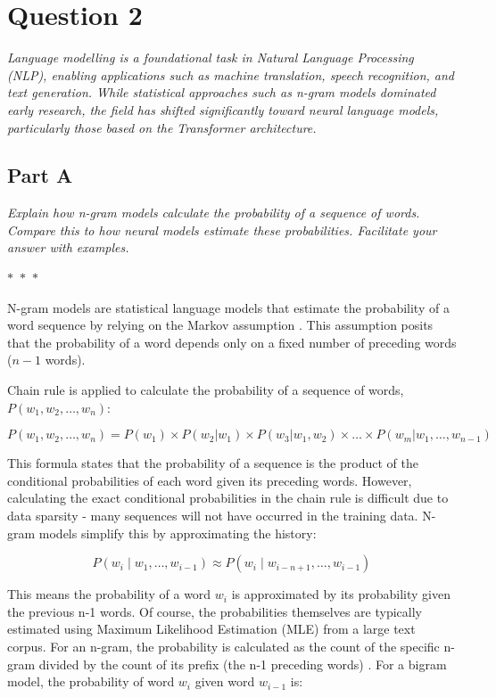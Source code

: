 \section*{Question 2}

\textit{Language modelling is a foundational task in Natural Language Processing (NLP), enabling applications such as machine translation, speech recognition, and text generation. While statistical approaches such as n-gram models dominated early research, the field has shifted significantly toward neural language models, particularly those based on the Transformer architecture.}

\subsection*{Part A}

\textit{Explain how n-gram models calculate the probability of a sequence of words. Compare this to how neural models estimate these probabilities. Facilitate your answer with examples.}

\begin{center}
  $\ast$~$\ast$~$\ast$
\end{center}

N-gram models are statistical language models that estimate the probability of a word sequence by relying on the Markov assumption \parencite{young_week_2024}. This assumption posits that the probability of a word depends only on a fixed number of preceding words ($n-1$ words).

Chain rule is applied to calculate the probability of a sequence of words, $P(w_1,w_2,\ldots,w_n)$:

$$P(w_1, w_2, \ldots, w_n) = P(w_1) \times P(w_2|w_1) \times P(w_3|w_1, w_2) \times \ldots \times P(w_m|w_1, \ldots, w_{n-1})$$

This formula states that the probability of a sequence is the product of the conditional probabilities of each word given its preceding words. However, calculating the exact conditional probabilities in the chain rule is difficult due to data sparsity - many sequences will not have occurred in the training data. N-gram models simplify this by approximating the history:

$$ P(w_i \mid w_1,\ldots,w_{i-1}) \approx P(w_i \mid w_{i-n+1},\ldots,w_{i-1}) $$

This means the probability of a word $w_i$ is approximated by its probability given the previous n-1 words. Of course, the probabilities themselves are typically estimated using Maximum Likelihood Estimation (MLE) from a large text corpus. For an n-gram, the probability is calculated as the count of the specific n-gram divided by the count of its prefix (the n-1 preceding words) \parencite{keselji_speech_2025}. For a bigram model, the probability of word $w_i$ given word $w_{i-1}$ is:

